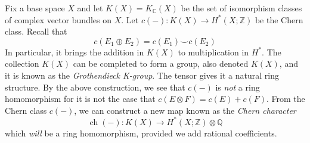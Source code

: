 \documentclass{book}
\newcommand{\C}{{\mathbb{C}}}
\newcommand{\Q}{{\mathbb{Q}}}
\newcommand{\Z}{{\mathbb{Z}}}
\newcommand{\ch}{{\operatorname{ch}}}
\begin{document}
Fix a base space $X$ and let $K(X) = K_\C(X)$ be the set of isomorphism classes of complex vector bundles on
$X$. Let $c(-): K(X) \to H^*(X; \Z)$ be the Chern class. Recall that
\[
  c(E_1\oplus E_2) = c(E_1)\smile c(E_2)
\]
In particular, it brings the addition in $K(X)$ to multiplication in $H^*$. The collection $K(X)$ can be
completed to form a group, also denoted $K(X)$, and it is known as the \emph{Grothendieck K-group}. The tensor
gives it a natural ring structure. By the above construction, we see that $c(-)$ is \emph{not} a ring
homomorphism for it is not the case that $c(E\otimes F) = c(E) + c(F)$. From the Chern class $c(-)$, we can construct a new map known as the \emph{Chern character}
\[
  \ch(-): K(X) \to H^*(X; \Z)\otimes \Q
\]
which \emph{will} be a ring homomorphism, provided we add rational coefficients.
\end{document}
